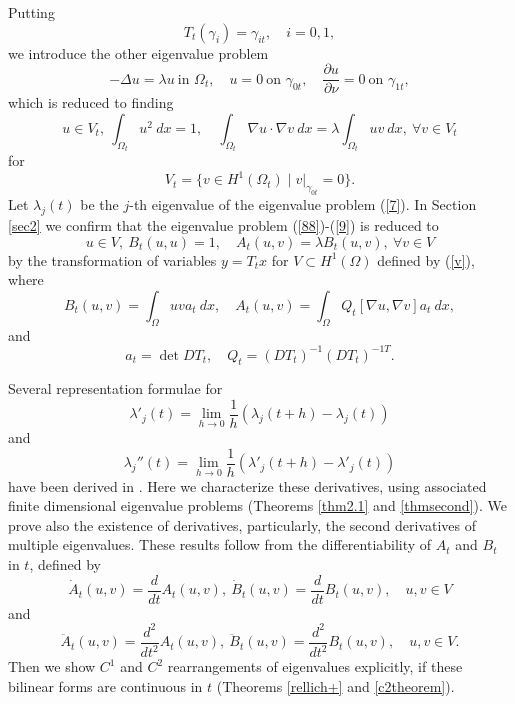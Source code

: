 \documentclass[final,a4paper]{jmsj}
\theoremstyle{thmstyleone}%
\theoremstyle{thmstyletwo}%
\theoremstyle{thmstylethree}%
\begin{document}
Putting  
\begin{equation} 
T_t(\gamma_i)=\gamma_{it}, \quad i=0,1, 
 \label{6}
\end{equation} 
we introduce the other eigenvalue problem 
\begin{equation}
  - \Delta u= \lambda u \ \mbox{in $\Omega_t$}, \quad
      u = 0 \ \mbox{on $\gamma_{0t}$}, \quad
      \frac{\partial u}{\partial \nu} = 0 \ \mbox{on $\gamma_{1t}$},
   \label{7}
\end{equation}
which is reduced to finding 
\begin{equation} 
u\in V_t, \ \int_{\Omega_t}u^2 \ dx=1, \quad \int_{\Omega_t}\nabla u\cdot \nabla v \ dx=\lambda\int_{\Omega_t}uv \ dx, \ \forall v\in V_t 
 \label{88}
\end{equation} 
for 
\begin{equation} 
V_t=\{ v\in H^1(\Omega_t) \mid \left. v\right\vert_{\gamma_{0t}}=0\}.  
 \label{9}
\end{equation} 
Let $\lambda_j(t)$ be the $j$-th eigenvalue of the eigenvalue problem (\ref{7}). In Section \ref{sec2} we confirm that the eigenvalue problem (\ref{88})-(\ref{9}) is reduced to 
\begin{equation} 
u\in V, \ B_t(u,u)=1, \quad A_t(u,v)=\lambda B_t(u,v), \ \forall v\in V 
 \label{wf}
\end{equation} 
by the transformation of variables $y=T_tx$ for $V\subset H^1(\Omega)$ defined by (\ref{v}), where 
\begin{equation} 
B_t(u,v)=\int_\Omega uv a_t \ dx, \quad A_t(u,v)=\int_\Omega Q_t[\nabla u, \nabla v] a_t \ dx,  
 \label{ab}
\end{equation} 
and 
\begin{equation} 
a_t=\det DT_t, \quad Q_t=(DT_t)^{-1}(DT_t)^{-1T}. 
 \label{cd}
\end{equation} 


Several representation formulae for 
\[ \lambda'_j(t)=\lim_{h\rightarrow 0}\frac{1}{h}(\lambda_j(t+h)-\lambda_j(t)) \] 
and 
\[ \lambda_j''(t)=\lim_{h\rightarrow 0}\frac{1}{h}(\lambda'_j(t+h)-\lambda'_j(t)) \] 
have been derived in \cite{gs52}. Here we characterize these derivatives, using associated finite dimensional eigenvalue problems (Theorems \ref{thm2.1} and \ref{thmsecond}). We prove also the existence of derivatives, particularly, the second derivatives of multiple eigenvalues. These results follow from the differentiability of $A_t$ and $B_t$ in $t$, defined by 
\begin{equation} 
\dot A_t(u,v)=\frac{d}{dt}A_t(u,v),  \ \dot B_t(u,v)=\frac{d}{dt}B_t(u,v), \quad u, v\in V 
 \label{dot}
\end{equation} 
and 
\begin{equation} 
\ddot A_t(u,v)=\frac{d^2}{dt^2}A_t(u,v),  \ \ddot B_t(u,v)=\frac{d^2}{dt^2}B_t(u,v), \quad u, v\in V.    
 \label{ddot+}
\end{equation}  
Then we show $C^1$ and $C^2$ rearrangements of eigenvalues explicitly, if  these bilinear forms are continuous in $t$ (Theorems \ref{rellich+} and \ref{c2theorem}). 
\end{document}
